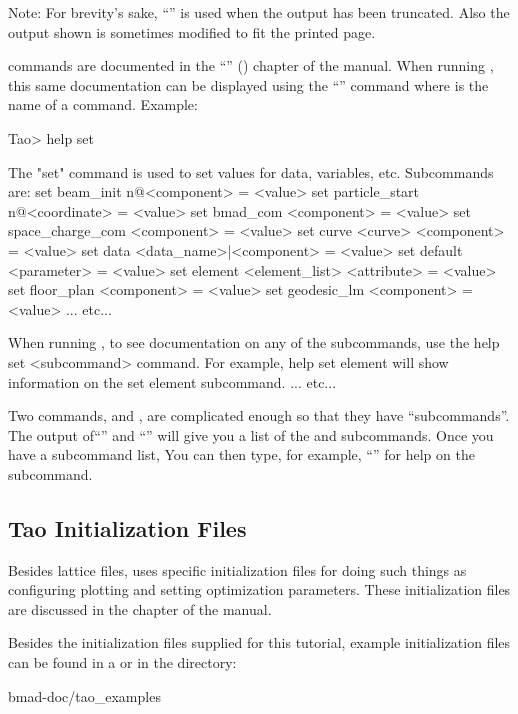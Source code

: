 \documentclass{hitec}     %
\begin{document}
Note: For brevity's sake, ``'' is used when the output has been truncated. Also the output shown
is sometimes modified to fit the printed page.

\tao commands are documented in the ``'' () chapter of the \tao
manual.  When running \tao, this same documentation can be displayed using the ``'' command where  is the name of a command. Example:
\begin{code}
Tao> help set

The "set" command is used to set values for data, variables, etc. 
Subcommands are:
  set beam_init {n@}<component> = <value>
  set particle_start {n@}<coordinate> = <value>
  set bmad_com <component> = <value>
  set space_charge_com <component> = <value>
  set curve <curve> <component> = <value>
  set data <data_name>|<component> = <value>
  set default <parameter> = <value>
  set element <element_list> <attribute> = <value>
  set floor_plan <component> = <value>
  set geodesic_lm <component> = <value>
... etc...

When running \tao, to see documentation on any of the subcommands, use the 
help set <subcommand> command. For example, help set element
will show information on the set element subcommand.
... etc...
\end{code}

Two commands,  and , are complicated enough so that they have ``subcommands''. The
output of``'' and ``'' will give you a list of the  and 
subcommands. Once you have a subcommand list, You can then type, for example, ``'' for help on the  subcommand.

\subsection{Tao Initialization Files}
\label{s:init.file}

Besides lattice files, \tao uses \tao specific initialization files for doing such things as
configuring plotting and setting optimization parameters. These initialization files are discussed
in the  chapter of the \tao manual.

Besides the initialization files supplied for this tutorial, example \tao initialization files can
be found in a  or  in the directory:
\begin{code}
bmad-doc/tao_examples
\end{code}
\end{document}

